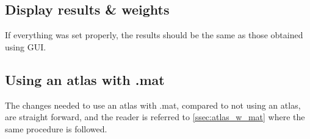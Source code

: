 
\subsection{Display results \& weights}

If everything was set properly, the results should be the same as those obtained using GUI.

\subsection{Using an atlas with .mat}

The changes needed to use an atlas with .mat, compared to not using an atlas, are straight forward, and the reader is referred to \ref{ssec:atlas_w_mat} where the same procedure is followed.

